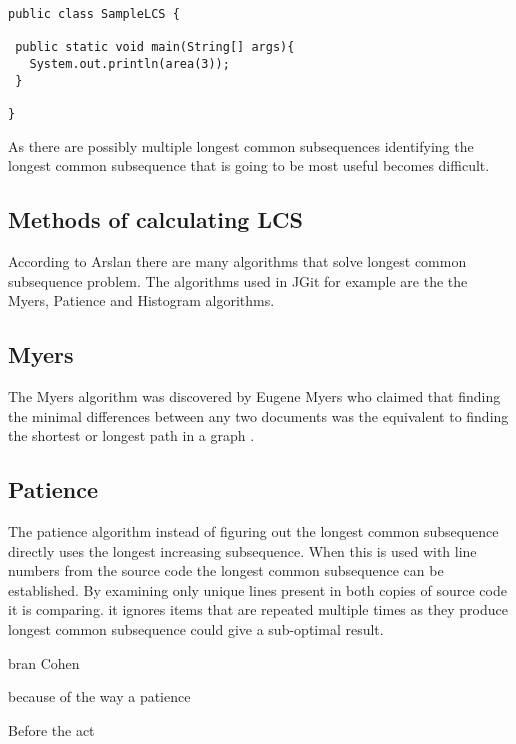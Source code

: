 \begin{lstlisting}
public class SampleLCS {

 public static void main(String[] args){
   System.out.println(area(3));
 }
 
}
\end{lstlisting}

As there are possibly multiple longest common subsequences identifying the longest common subsequence that is going to be most useful becomes difficult.

\subsection{Methods of calculating LCS}
According to Arslan \cite{Arslan2010} there are many algorithms that solve longest common subsequence problem. The algorithms used in JGit for example are the the Myers, Patience and Histogram algorithms.

\subsection{Myers}
The Myers algorithm was discovered by Eugene Myers who claimed that finding the minimal differences between any two documents was the equivalent to finding the shortest or longest path in a graph \cite{Myers1986}. 

\subsection{Patience}
The patience algorithm instead of figuring out the longest common subsequence directly uses the longest increasing subsequence.
When this is used with line numbers from the source code the longest common subsequence can be established.
By examining only unique lines present in both copies of source code it is comparing. it ignores items that are repeated multiple times as they produce longest common subsequence could give a sub-optimal result.

bran Cohen

because of the way a patience 

Before the act

